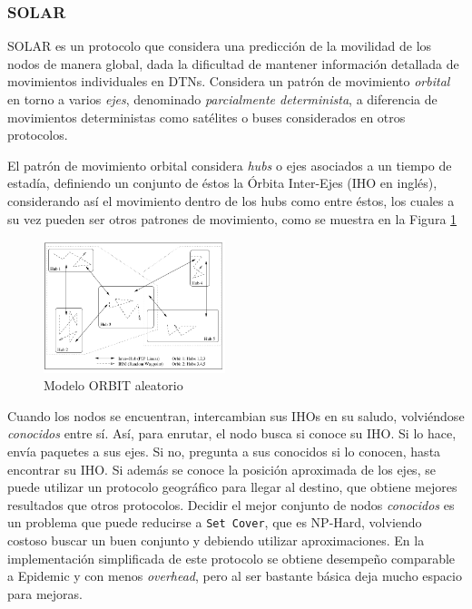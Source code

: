 \subsubsection{SOLAR}
SOLAR \cite{solar} es un protocolo que considera una predicción de la movilidad de los nodos de manera global, dada la dificultad de mantener información detallada de movimientos individuales en DTNs. Considera un patrón de movimiento \emph{orbital} en torno a varios \emph{ejes}, denominado \emph{parcialmente determinista}, a diferencia de movimientos deterministas como satélites o buses considerados en otros protocolos.

El patrón de movimiento orbital considera \emph{hubs} o ejes asociados a un tiempo de estadía, definiendo un conjunto de éstos la Órbita Inter-Ejes (IHO en inglés), considerando así el movimiento dentro de los hubs como entre éstos, los cuales a su vez pueden ser otros patrones de movimiento, como se muestra en la Figura \ref{fig:orbit}

\begin{figure}[h]
\centering
\includegraphics[width=200px]{solar-orbit.png}
\caption{Modelo ORBIT aleatorio \cite{solar}}
\label{fig:orbit}
\end{figure}

Cuando los nodos se encuentran, intercambian sus IHOs en su saludo, volviéndose \emph{conocidos} entre sí. Así, para enrutar, el nodo busca si conoce su IHO. Si lo hace, envía paquetes a sus ejes. Si no, pregunta a sus conocidos si lo conocen, hasta encontrar su IHO. Si además se conoce la posición aproximada de los ejes, se puede utilizar un protocolo geográfico para llegar al destino, que obtiene mejores resultados que otros protocolos.
Decidir el mejor conjunto de nodos \emph{conocidos} es un problema que puede reducirse a \texttt{Set Cover}, que es NP-Hard, volviendo costoso buscar un buen conjunto y debiendo utilizar aproximaciones.
En la implementación simplificada de este protocolo se obtiene desempeño comparable a Epidemic y con menos \emph{overhead}, pero al ser bastante básica deja mucho espacio para mejoras.